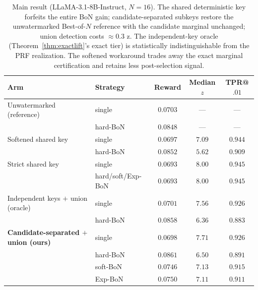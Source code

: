 \documentclass{article} %
\begin{document}
\begin{table}[t]
\caption{Main result (LLaMA-3.1-8B-Instruct, $N{=}16$). The shared
deterministic key forfeits the entire BoN gain; candidate-separated subkeys
restore the unwatermarked Best-of-$N$ reference with the candidate marginal
unchanged; union detection costs $\approx0.3$ z. The independent-key oracle
(Theorem~\ref{thm:exactlift}'s exact tier) is statistically indistinguishable
from the PRF realization. The softened workaround trades away the exact
marginal certification and retains less post-selection signal.}
\label{tab:main}
\begin{center}
\begin{tabular}{llccc}
\toprule
Arm & Strategy & Reward & Median $z$ & TPR@$.01$ \\
\midrule
Unwatermarked (reference) & single & $0.0703$ & --- & --- \\
 & hard-BoN & $0.0848$ & --- & --- \\
\midrule
Softened shared key & single & $0.0697$ & $7.09$ & $0.944$ \\
\citep{verma2025watermarking} & hard-BoN & $0.0852$ & $5.62$ & $0.909$ \\
\midrule
Strict shared key & single & $0.0693$ & $8.00$ & $0.945$ \\
 & hard/soft/Exp-BoN & $0.0693$ & $8.00$ & $0.945$ \\
\midrule
Independent keys $+$ union (oracle) & single & $0.0701$ & $7.56$ & $0.926$ \\
 & hard-BoN & $0.0858$ & $6.36$ & $0.883$ \\
\midrule
\textbf{Candidate-separated $+$ union (ours)} & single & $0.0698$ & $7.71$ & $0.926$ \\
 & hard-BoN & $\mathbf{0.0861}$ & $6.50$ & $0.891$ \\
 & soft-BoN & $0.0746$ & $7.13$ & $0.915$ \\
 & Exp-BoN & $0.0750$ & $7.11$ & $0.911$ \\
\bottomrule
\end{tabular}
\end{center}
\end{table}
\end{document}
